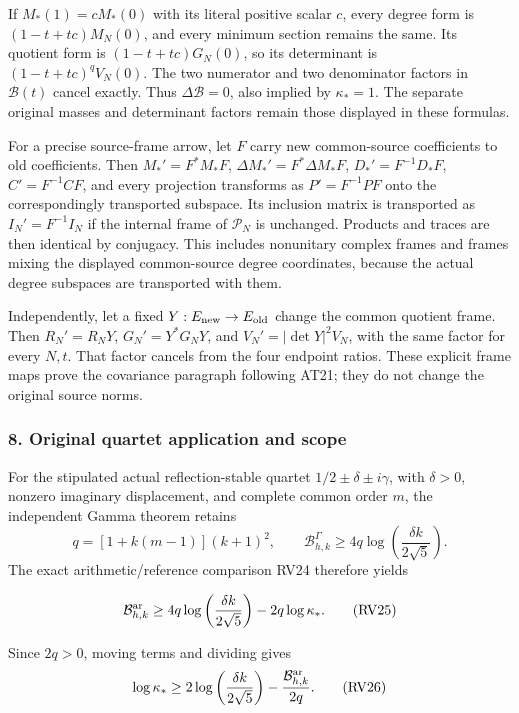 \documentclass{article}
\begin{document}
If \(M_*(1)=cM_*(0)\) with its literal positive scalar \(c\), every degree form is \((1-t+tc)M_N(0)\), and every minimum section remains the same. Its quotient form is \((1-t+tc)G_N(0)\), so its determinant is \((1-t+tc)^qV_N(0)\). The two numerator and two denominator factors in \(\mathcal B(t)\) cancel exactly. Thus \(\Delta\mathcal B=0\), also implied by \(\kappa_*=1\). The separate original masses and determinant factors remain those displayed in these formulas.

For a precise source-frame arrow, let \(F\) carry new common-source coefficients to old coefficients. Then \(M_*'=F^*M_*F\), \(\Delta M_*'=F^*\Delta M_*F\), \(D_*'=F^{-1}D_*F\), \(C'=F^{-1}CF\), and every projection transforms as \(P'=F^{-1}PF\) onto the correspondingly transported subspace. Its inclusion matrix is transported as \(I_N'=F^{-1}I_N\) if the internal frame of \(\mathcal P_N\) is unchanged. Products and traces are then identical by conjugacy. This includes nonunitary complex frames and frames mixing the displayed common-source degree coordinates, because the actual degree subspaces are transported with them.

Independently, let a fixed \(Y:E_{\rm new}\to E_{\rm old}\) change the common quotient frame. Then \(R_N'=R_NY\), \(G_N'=Y^*G_NY\), and \(V_N'=|\det Y|^2V_N\), with the same factor for every \(N,t\). That factor cancels from the four endpoint ratios. These explicit frame maps prove the covariance paragraph following AT21; they do not change the original source norms.

\subsubsection{8. Original quartet application and scope}\label{endpoint-determinant_review--original-quartet-application-and-scope}

For the stipulated actual reflection-stable quartet \(1/2\pm\delta\pm i\gamma\), with \(\delta>0\), nonzero imaginary displacement, and complete common order \(m\), the independent Gamma theorem retains \[
q=[1+k(m-1)](k+1)^2,\qquad
\mathcal B^\Gamma_{h,k}\ge4q\log\left(\frac{\delta k}{2\sqrt5}\right).
\] The exact arithmetic/reference comparison RV24 therefore yields

\[
\mathcal B^{\rm ar}_{h,k}\ge
4q\log\left(\frac{\delta k}{2\sqrt5}\right)-2q\log\kappa_*.
\tag{RV25}
\]

Since \(2q>0\), moving terms and dividing gives \[
\log\kappa_*\ge
2\log\left(\frac{\delta k}{2\sqrt5}\right)
-\frac{\mathcal B^{\rm ar}_{h,k}}{2q}.
\tag{RV26}
\]
\end{document}
